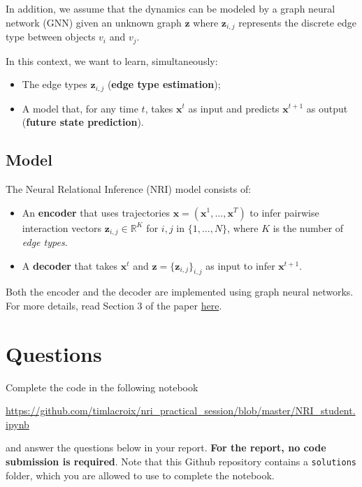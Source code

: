 \documentclass{article}
\begin{document}
In addition,  we assume that the dynamics can be modeled by a graph neural network (GNN) given an unknown graph $\mathbf{z}$ where $\mathbf{z}_{i,j}$ represents the discrete edge type between objects $v_i$ and $v_j$.

In this context, we want to learn, simultaneously:

\begin{itemize}
	\item The edge types $\mathbf{z}_{i,j}$ (\textbf{edge type estimation}); 
	\item A model that, for any time $t$, takes $\mathbf{x}^t$ as input and predicts $\mathbf{x}^{t+1}$ as output (\textbf{future state prediction}).
\end{itemize}

\subsection{Model}

The Neural Relational Inference (NRI) model consists of:

\begin{itemize}
	\item An \textbf{encoder} that uses trajectories $\mathbf{x} = (\mathbf{x}^1, \ldots, \mathbf{x}^T)$ to infer pairwise interaction vectors $\mathbf{z}_{i, j} \in \mathbb{R}^K$ for $i, j$ in $\{1, \ldots, N \}$, where $K$ is the number of \emph{edge types}.
	\item A \textbf{decoder} that takes $\mathbf{x}^t$ and $\mathbf{z} = \{\mathbf{z}_{i, j}\}_{i,j}$ as input to infer $\mathbf{x}^{t+1}$.
\end{itemize}

Both the encoder and the decoder are implemented using graph neural networks. For more details, read Section 3 of the paper \href{https://arxiv.org/pdf/1802.04687.pdf}{here}.

 
\section{Questions}

Complete the code in the following notebook

\url{https://github.com/timlacroix/nri_practical_session/blob/master/NRI_student.ipynb}

and answer the questions below in your report. \textbf{For the report, no code submission is required}. Note that this Github repository contains a \texttt{solutions} folder, which you are allowed to use to complete the notebook. 
\end{document}

